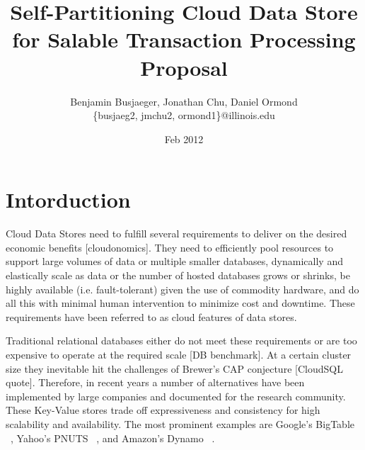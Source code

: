\documentclass[10pt,final,journal]{IEEEtran}
\begin{document}
\title{Self-Partitioning Cloud Data Store for Salable Transaction Processing Proposal}
\author{Benjamin Busjaeger, Jonathan Chu, Daniel Ormond \\
\{busjaeg2, jmchu2, ormond1\}@illinois.edu}
\date{Feb 2012}
\maketitle



\section{Intorduction}
Cloud Data Stores need to fulfill several requirements to deliver on the desired economic benefits [cloudonomics]. They need to efficiently pool resources to support large volumes of data or multiple smaller databases, dynamically and elastically scale as data or the number of hosted databases grows or shrinks, be highly available (i.e. fault-tolerant) given the use of commodity hardware, and do all this with minimal human intervention to minimize cost and downtime. These requirements have been referred to as cloud features of data stores.

Traditional relational databases either do not meet these requirements or are too expensive to operate at the required scale [DB benchmark]. At a certain cluster size they inevitable hit the challenges of Brewer's CAP conjecture [CloudSQL quote]. Therefore, in recent years a number of alternatives have been implemented by large companies and documented for the research community. These Key-Value stores trade off expressiveness and consistency for high scalability and availability. The most prominent examples are Google's BigTable ~\cite{Chang:2006:BDS:1267308.1267323}, Yahoo's PNUTS ~\cite{Cooper:2008:PYH:1454159.1454167}, and Amazon's Dynamo ~\cite{DeCandia:2007:DAH:1323293.1294281}.
\end{document}
